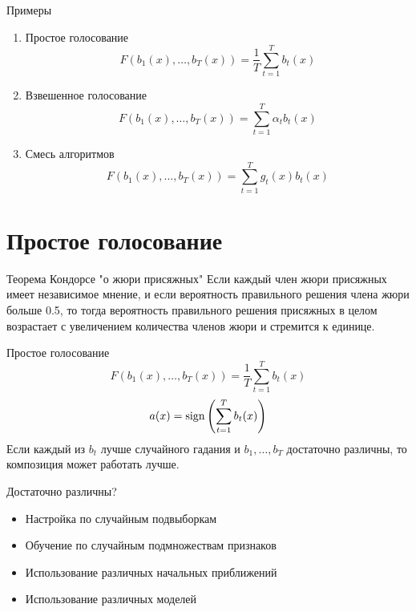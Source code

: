 \documentclass[10pt]{beamer}
\begin{document}
\begin{frame}{Примеры}
  \begin{enumerate}
    \item Простое голосование\\
      $$F(b_1(x), \dots, b_T(x)) = \frac{1}{T}\sum\limits_{t=1}^{T} b_t(x)$$
    \item Взвешенное голосование\\
      $$F(b_1(x), \dots, b_T(x)) = \sum\limits_{t=1}^{T} \alpha_t b_t(x)$$
    \item Смесь алгоритмов\\
      $$F(b_1(x), \dots, b_T(x)) = \sum\limits_{t=1}^{T} g_t(x) b_t(x)$$      
  \end{enumerate}
\end{frame}

\section{Простое голосование}

\begin{frame}{Теорема Кондорсе "о жюри присяжных"}
  Если каждый член жюри присяжных имеет независимое мнение, и если вероятность правильного решения члена жюри больше 0.5, то тогда вероятность правильного решения присяжных в целом возрастает с увеличением количества членов жюри и стремится к единице.   
\end{frame}


\begin{frame}{Простое голосование}
  $$F(b_1(x), \dots, b_T(x)) = \frac{1}{T}\sum\limits_{t=1}^{T} b_t(x)$$
  \bigbreak
  \pause
  $$a(x) = \operatorname{sign} \left( \sum\limits_{t=1}^{T} b_t(x) \right)$$
  \bigbreak
  \pause
  Если каждый из $b_t$ лучше случайного гадания и $b_1, \dots, b_T$ достаточно различны, то композиция может работать лучше.
\end{frame}

\begin{frame}{Достаточно различны?}
  \begin{itemize}
    \item Настройка по случайным подвыборкам
    \item Обучение по случайным подмножествам признаков
    \item Использование различных начальных приближений 
    \item Использование различных моделей
  \end{itemize}
\end{frame}
\end{document}
